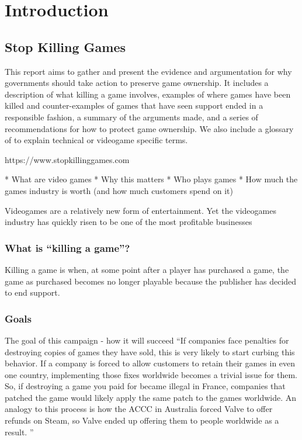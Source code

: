 \chapter{Introduction}

\section{Stop Killing Games}
This report aims to gather and present the evidence and argumentation for why governments should take action to preserve game ownership.
It includes a description of what killing a game involves,
examples of where games have been killed and counter-examples of games that have seen support ended in a responsible fashion,
a summary of the arguments made,
and a series of recommendations for how to protect game ownership.
We also include a glossary of to explain technical or videogame specific terms.


https://www.stopkillinggames.com

* What are video games
* Why this matters
* Who plays games
* How much the games industry is worth (and how much customers spend on it)

Videogames are a relatively new form of entertainment.
Yet the videogames industry has quickly risen to be one of the most profitable businesses

\subsection{What is ``killing a game''?}
Killing a game is when, at some point after a player has purchased a game, the game as purchased becomes no longer playable because the publisher has decided to end support.

\subsection{Goals}
The goal of this campaign - how it will succeed
``If companies face penalties for destroying copies of games they have sold, this is very likely to start curbing this behavior.
If a company is forced to allow customers to retain their games in even one country, implementing those fixes worldwide becomes a trivial issue for them.
So, if destroying a game you paid for became illegal in France, companies that patched the game would likely apply the same patch to the games worldwide.
An analogy to this process is how the ACCC in Australia forced Valve to offer refunds on Steam, so Valve ended up offering them to people worldwide as a result.
''

